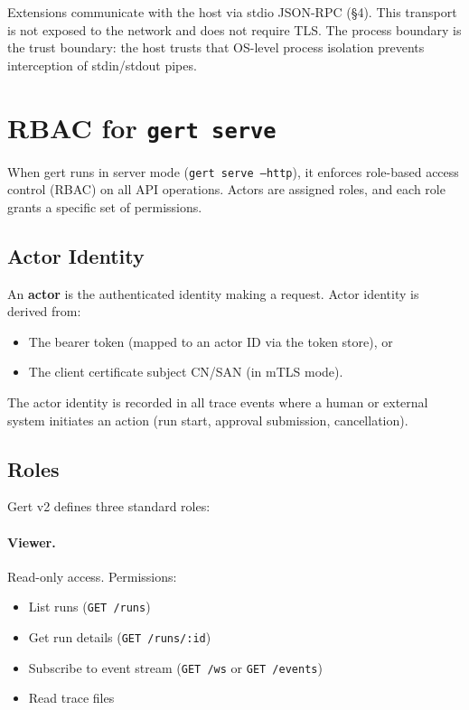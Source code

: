 Extensions communicate with the host via stdio JSON-RPC (§4).  This transport
is not exposed to the network and does not require TLS.  The process boundary
is the trust boundary: the host trusts that OS-level process isolation prevents
interception of stdin/stdout pipes.

\section{RBAC for \texttt{gert serve}}
\label{sec:rbac}

When gert runs in server mode (\texttt{gert serve --http}), it enforces
role-based access control (RBAC) on all API operations.  Actors are assigned
roles, and each role grants a specific set of permissions.

\subsection{Actor Identity}

An \textbf{actor} is the authenticated identity making a request.  Actor
identity is derived from:

\begin{itemize}
  \item The bearer token (mapped to an actor ID via the token store), or
  \item The client certificate subject CN/SAN (in mTLS mode).
\end{itemize}

The actor identity is recorded in all trace events where a human or external
system initiates an action (run start, approval submission, cancellation).

\subsection{Roles}

Gert v2 defines three standard roles:

\paragraph{Viewer.}
Read-only access.  Permissions:

\begin{itemize}
  \item List runs (\texttt{GET /runs})
  \item Get run details (\texttt{GET /runs/:id})
  \item Subscribe to event stream (\texttt{GET /ws} or \texttt{GET /events})
  \item Read trace files
\end{itemize}

